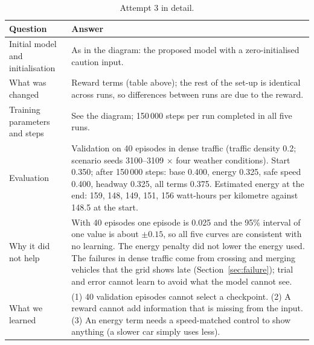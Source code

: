 \begin{table}[H]\centering\small
\caption{Attempt 3 in detail.}\label{tab:rl3b}
\begin{tabularx}{\textwidth}{@{}>{\raggedright\arraybackslash}p{3.4cm}X@{}}\toprule
Question & Answer\\\midrule
Initial model and initialisation & As in the diagram: the proposed model with a zero-initialised caution input.\\
What was changed & Reward terms (table above); the rest of the set-up is identical across runs, so differences between runs are due to the reward.\\
Training parameters and steps & See the diagram; 150\,000 steps per run completed in all five runs.\\
Evaluation & Validation on 40 episodes in dense traffic (traffic density 0.2; scenario seeds 3100--3109 $\times$ four weather conditions). Start 0.350; after 150\,000 steps: base 0.400, energy 0.325, safe speed 0.400, headway 0.325, all terms 0.375. Estimated energy at the end: 159, 148, 149, 151, 156 watt-hours per kilometre against 148.5 at the start.\\
Why it did not help & With 40 episodes one episode is 0.025 and the 95\% interval of one value is about $\pm0.15$, so all five curves are consistent with no learning. The energy penalty did not lower the energy used. The failures in dense traffic come from crossing and merging vehicles that the grid shows late (Section~\ref{sec:failure}); trial and error cannot learn to avoid what the model cannot see.\\
What we learned & (1) 40 validation episodes cannot select a checkpoint. (2) A reward cannot add information that is missing from the input. (3) An energy term needs a speed-matched control to show anything (a slower car simply uses less).\\\bottomrule
\end{tabularx}
\end{table}

